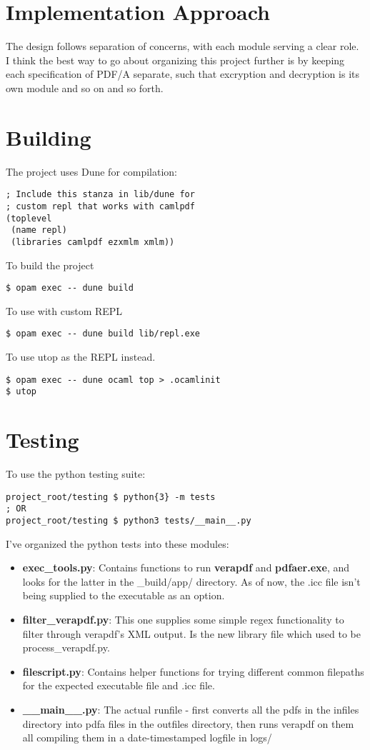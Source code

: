 \documentclass[11pt]{article}
\begin{document}
\section*{Implementation Approach}
The design follows separation of concerns, with each module serving a clear role. 
I think the best way to go about organizing this project further is by keeping each specification of PDF/A separate,
such that excryption and decryption is its own module and so on and so forth. 

\section*{Building}
The project uses Dune for compilation:
\begin{verbatim}
; Include this stanza in lib/dune for 
; custom repl that works with camlpdf
(toplevel
 (name repl)
 (libraries camlpdf ezxmlm xmlm))
\end{verbatim}
To build the project 
\begin{verbatim}
$ opam exec -- dune build
\end{verbatim}
To use with custom REPL
\begin{verbatim}
$ opam exec -- dune build lib/repl.exe
\end{verbatim}
To use utop as the REPL instead.
\begin{verbatim}
$ opam exec -- dune ocaml top > .ocamlinit
$ utop
\end{verbatim}

\section*{Testing}
To use the python testing suite:
\begin{verbatim}
project_root/testing $ python{3} -m tests
; OR
project_root/testing $ python3 tests/__main__.py
\end{verbatim}

I've organized the python tests into these modules:
\begin{itemize}
  \item \textbf{exec\_tools.py}: Contains functions to run \textbf{verapdf} and \textbf{pdfaer.exe}, and looks for the latter in the \_build/app/ directory. As of now, the .icc file isn't being supplied to the executable as an option.
  \item \textbf{filter\_verapdf.py}: This one supplies some simple regex functionality to filter through verapdf's XML output. Is the new library file which used to be process\_verapdf.py. 
  \item \textbf{filescript.py}: Contains helper functions for trying different common filepaths for the expected executable file and .icc file.
  \item \textbf{\_\_main\_\_.py}: The actual runfile - first converts all the pdfs in the infiles directory into pdfa files in the outfiles directory, then runs verapdf on them all compiling them in a date-timestamped logfile in logs/
\end{itemize}
\end{document}
